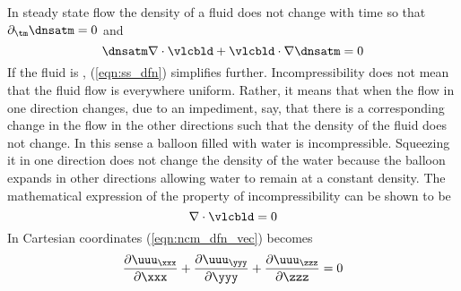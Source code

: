 \documentclass[12pt,twoside]{book}
\begin{document}
In steady state flow the density of a fluid does not change with time
so that $\partial_{\tm} \dnsatm = 0$ and 
\begin{equation}
\dnsatm \nabla \cdot \vlcbld + \vlcbld \cdot \nabla \dnsatm = 0
\label{eqn:ss_dfn}
\end{equation}
If the fluid is , (\ref{eqn:ss_dfn})
simplifies further.
Incompressibility does not mean that the fluid flow is everywhere
uniform. 
Rather, it means that when the flow in one direction changes, due to
an impediment, say, that there is a corresponding change in the flow
in the other directions such that the density of the fluid does not
change. 
In this sense a balloon filled with water is incompressible.
Squeezing it in one direction does not change the density of the water
because the balloon expands in other directions allowing water to
remain at a constant density.
The mathematical expression of the property of incompressibility can
be shown to be \cite[e.g.,][]{Dut86}
\begin{equation}
\nabla \cdot \vlcbld = 0
\label{eqn:ncm_dfn_vec}
\end{equation}
In Cartesian coordinates (\ref{eqn:ncm_dfn_vec}) becomes
\begin{equation}
\frac{\partial \uuu_{\xxx}}{\partial \xxx} + 
\frac{\partial \uuu_{\yyy}}{\partial \yyy} + 
\frac{\partial \uuu_{\zzz}}{\partial \zzz} = 0 
\label{eqn:ncm_dfn_crt}
\end{equation}
\end{document}
